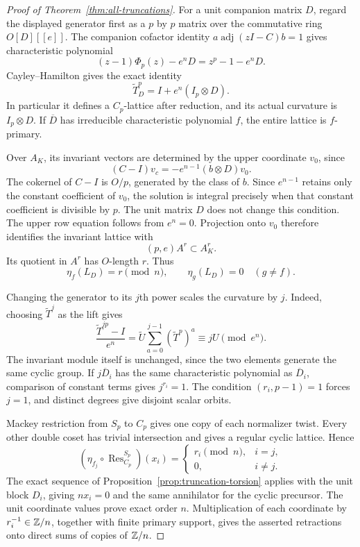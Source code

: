 \begin{proof}[Proof of Theorem~\ref{thm:all-truncations}]
For a unit companion matrix $D$, regard the displayed generator
first as a $p$ by $p$ matrix over the commutative ring
$O[D][[e]]$.  The companion cofactor identity
$a\operatorname{adj}(zI-C)b=1$ gives characteristic polynomial
\[
 (z-1)\Phi_p(z)-e^nD=z^p-1-e^nD.
\]
Cayley--Hamilton gives the exact identity
\begin{equation}\label{eq:all-truncation-companion-curvature}
 \widetilde T_D^p=I+e^n(I_p\otimes D).
\end{equation}
In particular it defines a $C_p$-lattice after reduction, and its
actual curvature is $I_p\otimes D$.
If $\overline D$ has irreducible characteristic polynomial $f$,
the entire lattice is $f$-primary.

Over $A_K$, its invariant vectors are determined by the upper
coordinate $v_0$, since
\[
 (C-I)v_c=-e^{n-1}(b\otimes D)v_0.
\]
The cokernel of $C-I$ is $O/p$, generated by the class of $b$.
Since $e^{n-1}$ retains only the constant coefficient of $v_0$,
the solution is integral precisely when that constant coefficient
is divisible by $p$.  The unit matrix $D$ does not change this
condition.  The upper row equation follows from $e^n=0$.
Projection onto $v_0$ therefore identifies the invariant lattice
with
\[
 (p,e)A^r\subset A_K^r.
\]
Its quotient in $A^r$ has $O$-length $r$.  Thus
\[
 \eta_f(L_D)=r\pmod n,
 \qquad \eta_g(L_D)=0\quad(g\ne f).
\]

Changing the generator to its $j$th power scales the curvature by
$j$.  Indeed, choosing $\widetilde T^j$ as the lift gives
\[
 \frac{\widetilde T^{jp}-I}{e^n}
 =\widetilde U\sum_{a=0}^{j-1}(\widetilde T^p)^a
 \equiv jU\pmod{e^n}.
\]
The invariant module itself is unchanged, since the two elements
generate the same cyclic group.  If $j\overline D_i$ has the same
characteristic polynomial as $\overline D_i$, comparison of
constant terms gives $j^{r_i}=1$.  The condition
$(r_i,p-1)=1$ forces $j=1$, and distinct degrees give disjoint
scalar orbits.

Mackey restriction from $S_p$ to $C_p$ gives one copy of each
normalizer twist.  Every other double coset has trivial intersection
and gives a regular cyclic lattice.  Hence
\[
 (\eta_{f_j}\circ\operatorname{Res}_{C_p}^{S_p})(x_i)
  =\begin{cases}r_i\pmod n,&i=j,\\0,&i\ne j.\end{cases}
\]
The exact sequence of Proposition~\ref{prop:truncation-torsion}
applies with the unit block $D_i$, giving $nx_i=0$ and the same
annihilator for the cyclic precursor.  The unit coordinate values
prove exact order $n$.  Multiplication of each coordinate by
$r_i^{-1}\in\mathbb Z/n$, together with finite primary support, gives
the asserted retractions onto direct sums of copies of $\mathbb Z/n$.


\end{proof}
